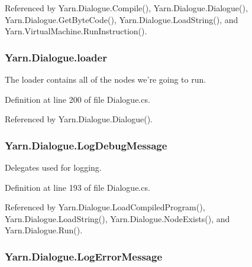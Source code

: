 Referenced by Yarn.\-Dialogue.\-Compile(), Yarn.\-Dialogue.\-Dialogue(), Yarn.\-Dialogue.\-Get\-Byte\-Code(), Yarn.\-Dialogue.\-Load\-String(), and Yarn.\-Virtual\-Machine.\-Run\-Instruction().

\hypertarget{a00094_a98bbe0ac2ccadeeeb7e05e3e6e19f2e0}{
\subsubsection[{loader}]{ Yarn.\-Dialogue.\-loader\hspace{0.3cm}{\ttfamily [package]}}}\label{a00094_a98bbe0ac2ccadeeeb7e05e3e6e19f2e0}


The loader contains all of the nodes we're going to run. 



Definition at line 200 of file Dialogue.\-cs.



Referenced by Yarn.\-Dialogue.\-Dialogue().

\hypertarget{a00094_a381f48bb0fbb294f8cf44ca57f11be31}{
\subsubsection[{Log\-Debug\-Message}]{ Yarn.\-Dialogue.\-Log\-Debug\-Message}}\label{a00094_a381f48bb0fbb294f8cf44ca57f11be31}


Delegates used for logging. 



Definition at line 193 of file Dialogue.\-cs.



Referenced by Yarn.\-Dialogue.\-Load\-Compiled\-Program(), Yarn.\-Dialogue.\-Load\-String(), Yarn.\-Dialogue.\-Node\-Exists(), and Yarn.\-Dialogue.\-Run().

\hypertarget{a00094_a9801e83dd044d6498fdf6ebcc6bec5ac}{
\subsubsection[{Log\-Error\-Message}]{ Yarn.\-Dialogue.\-Log\-Error\-Message}}\label{a00094_a9801e83dd044d6498fdf6ebcc6bec5ac}


